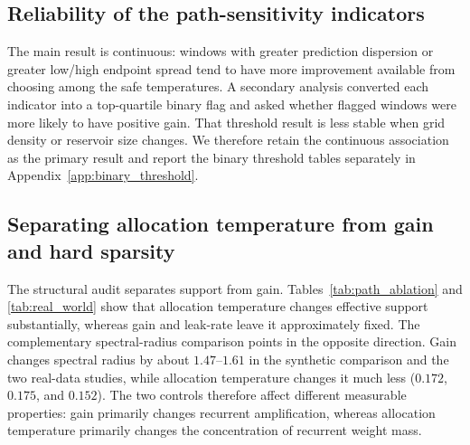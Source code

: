 \documentclass[11pt,a4paper]{article}
\begin{document}
\begin{table}[t]
\centering
\caption{Safe-region width at $\epsilon_{\mathrm{rel}}=0.10$ using each study's native absolute tolerance. The controlled synthetic panel and Air Quality show containment enrichment over same-width controls, while Appliances Energy provides a null/counterexample. Mean best-safe gain uses the same definition in all rows.}
\label{tab:m21_safe_width}
\end{table}

\subsection{Reliability of the path-sensitivity indicators}

The main result is continuous: windows with greater prediction dispersion or greater low/high endpoint spread tend to have more improvement available from choosing among the safe temperatures. A secondary analysis converted each indicator into a top-quartile binary flag and asked whether flagged windows were more likely to have positive gain. That threshold result is less stable when grid density or reservoir size changes. We therefore retain the continuous association as the primary result and report the binary threshold tables separately in Appendix~\ref{app:binary_threshold}.

\subsection{Separating allocation temperature from gain and hard sparsity}

The structural audit separates support from gain. Tables~\ref{tab:path_ablation} and \ref{tab:real_world} show that allocation temperature changes effective support substantially, whereas gain and leak-rate leave it approximately fixed. The complementary spectral-radius comparison points in the opposite direction. Gain changes spectral radius by about $1.47$--$1.61$ in the synthetic comparison and the two real-data studies, while allocation temperature changes it much less ($0.172$, $0.175$, and $0.152$). The two controls therefore affect different measurable properties: gain primarily changes recurrent amplification, whereas allocation temperature primarily changes the concentration of recurrent weight mass.
\end{document}
